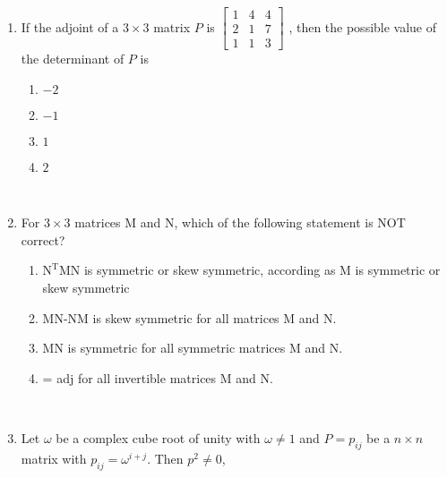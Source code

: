 \documentclass[journal,12pt,twocolumn]{IEEEtran}
\theoremstyle{remark}
\begin{document}
\begin{enumerate}
\begin{enumerate}
				\item 
					If the adjoint of a $3 \times 3$ matrix $P$ is 
							$\begin{bmatrix}
								1&4&4\\
								2&1&7\\
								1&1&3
							\end{bmatrix}$
					, then the possible value of the determinant of $P$ is 
						\begin{enumerate}
							\item $-2$
							\item $-1$
							\item $1$
							\item $2$
						\end{enumerate}
						\hfill {}\\
				\item 
					For $3 \times 3$ matrices M and N, which of the following statement is  NOT correct?
						\begin{enumerate}
							\item $\mathrm{N^TMN}$ is symmetric or skew symmetric, according as M is symmetric or skew symmetric
							\item MN-NM is skew symmetric for all matrices M and N.
							\item MN is symmetric for all symmetric matrices M and N.
							\item {} = adj for all invertible matrices M and N.
						\end{enumerate}
						\hfill {}\\
				\item 
					Let $\omega$ be a complex cube root of unity with $\omega \neq 1 $ and $P={p_{ij}}$ be a $n \times n$ matrix with $p_{ij} = \omega^{i+j}$. Then $p^2 \neq 0$,  
			\end{enumerate}
\end{enumerate}
\end{document}
